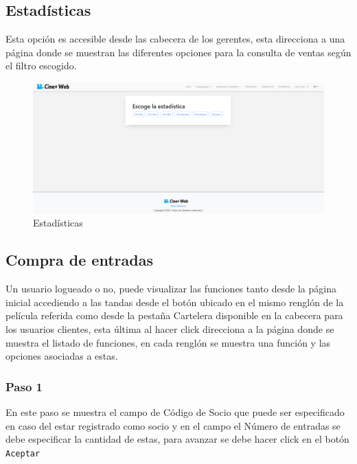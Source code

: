 \subsection{Estad\'isticas}
Esta opci\'on es accesible desde las cabecera de los gerentes, esta direcciona a una p\'agina donde se muestran las diferentes opciones para la consulta de ventas seg\'un el filtro escogido.
\newpage
\begin{figure}[h!]
	\centering
	\includegraphics[scale=0.35]{./chapters/img/statistics.png}
	
	\label{fig:statistics}
	\caption{Estad\'isticas}
	
\end{figure}
\subsection{Compra de entradas}
Un usuario logueado o no, puede visualizar las funciones tanto desde la p\'agina inicial accediendo a las tandas desde el bot\'on ubicado en el mismo rengl\'on de la pel\'icula referida como desde la pesta\~na Cartelera disponible en la cabecera para los usuarios clientes, esta \'ultima al hacer click direcciona a la p\'agina donde se muestra el listado de funciones, en cada rengl\'on se muestra una funci\'on y las opciones asociadas a estas.\\

\subsubsection{Paso 1}
En este paso se muestra el campo de C\'odigo de Socio que puede ser especificado en caso del  estar registrado como socio y en el campo el N\'umero de entradas se debe especificar la cantidad de estas, para avanzar se debe hacer click en el bot\'on \verb*|Aceptar|\\

